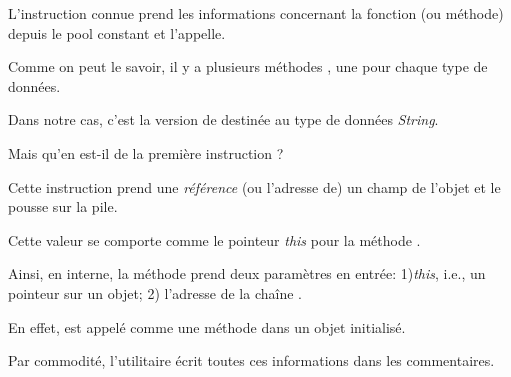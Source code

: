 L'instruction connue  prend les informations concernant la fonction
 (ou méthode) depuis le pool constant et l'appelle.

Comme on peut le savoir, il y a plusieurs méthodes , une pour chaque
type de données.

Dans notre cas, c'est la version de  destinée au type de données \emph{String}.


Mais qu'en est-il de la première instruction ?

Cette instruction prend une \emph{référence} (ou l'adresse de) un champ de l'objet
 et le pousse sur la pile.

Cette valeur se comporte comme le pointeur \emph{this} pour la méthode .

Ainsi, en interne, la méthode  prend deux paramètres en entrée:
1)\emph{this}, i.e., un pointeur sur un objet;
2) l'adresse de la chaîne .

En effet,  est appelé comme une méthode dans un objet 
initialisé.


Par commodité, l'utilitaire  écrit toutes ces informations dans les commentaires.

